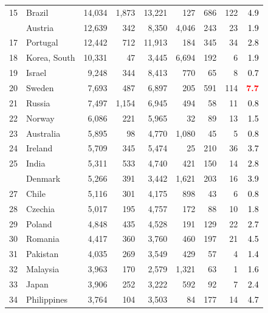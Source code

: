 \documentclass[12pt, a4paper,oneside]{book}
\theoremstyle{definition}
\begin{document}
\begin{longtable}{llrrrrrrr}
	\rowcolor{gray!6}  15 & Brazil & 14,034 & 1,873 & 13,221 & 127 & 686 & 122 & \textcolor{black}{4.9}\\
	\addlinespace
	16 & Austria & 12,639 & 342 & 8,350 & 4,046 & 243 & 23 & \textcolor{black}{1.9}\\
	\rowcolor{gray!6}  17 & Portugal & 12,442 & 712 & 11,913 & 184 & 345 & 34 & \textcolor{black}{2.8}\\
	18 & Korea, South & 10,331 & 47 & 3,445 & 6,694 & 192 & 6 & \textcolor{black}{1.9}\\
	\rowcolor{gray!6}  19 & Israel & 9,248 & 344 & 8,413 & 770 & 65 & 8 & \textcolor{black}{0.7}\\
	20 & Sweden & 7,693 & 487 & 6,897 & 205 & 591 & 114 & \textcolor{red}{\textbf{7.7}}\\
	\addlinespace
	\rowcolor{gray!6}  21 & Russia & 7,497 & 1,154 & 6,945 & 494 & 58 & 11 & \textcolor{black}{0.8}\\
	22 & Norway & 6,086 & 221 & 5,965 & 32 & 89 & 13 & \textcolor{black}{1.5}\\
	\rowcolor{gray!6}  23 & Australia & 5,895 & 98 & 4,770 & 1,080 & 45 & 5 & \textcolor{black}{0.8}\\
	24 & Ireland & 5,709 & 345 & 5,474 & 25 & 210 & 36 & \textcolor{black}{3.7}\\
	\rowcolor{gray!6}  25 & India & 5,311 & 533 & 4,740 & 421 & 150 & 14 & \textcolor{black}{2.8}\\
	\addlinespace
	26 & Denmark & 5,266 & 391 & 3,442 & 1,621 & 203 & 16 & \textcolor{black}{3.9}\\
	\rowcolor{gray!6}  27 & Chile & 5,116 & 301 & 4,175 & 898 & 43 & 6 & \textcolor{black}{0.8}\\
	28 & Czechia & 5,017 & 195 & 4,757 & 172 & 88 & 10 & \textcolor{black}{1.8}\\
	\rowcolor{gray!6}  29 & Poland & 4,848 & 435 & 4,528 & 191 & 129 & 22 & \textcolor{black}{2.7}\\
	30 & Romania & 4,417 & 360 & 3,760 & 460 & 197 & 21 & \textcolor{black}{4.5}\\
	\addlinespace
	\rowcolor{gray!6}  31 & Pakistan & 4,035 & 269 & 3,549 & 429 & 57 & 4 & \textcolor{black}{1.4}\\
	32 & Malaysia & 3,963 & 170 & 2,579 & 1,321 & 63 & 1 & \textcolor{black}{1.6}\\
	\rowcolor{gray!6}  33 & Japan & 3,906 & 252 & 3,222 & 592 & 92 & 7 & \textcolor{black}{2.4}\\
	34 & Philippines & 3,764 & 104 & 3,503 & 84 & 177 & 14 & \textcolor{black}{4.7}\\

\end{longtable}
\end{document}
